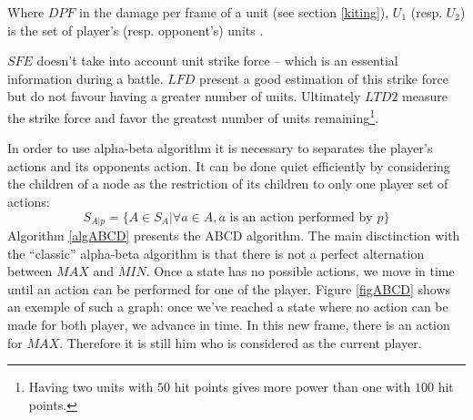 Where $DPF$ in the damage per frame of a unit (see section \ref{kiting}), $U_1$ (resp. $U_2$) is the set of player's (resp. opponent's) units .

$SFE$ doesn't take into account unit strike force -- which is an essential information during a battle. 
$LFD$ present a good estimation of this strike force but do not favour having a greater number of units. 
Ultimately $LTD2$ measure the strike force and favor the greatest number of units remaining\footnote{Having two units with $50$ hit points gives more power than one with $100$ hit points.}.

In order to use alpha-beta algorithm it is necessary to separates the player's actions and its opponents action.
It can be done quiet efficiently by considering the children of a node as the restriction of its children to only one player set of actions:
$$
S_{A|p} = \{A \in S_A | \forall a \in A, a \text{ is an action performed by $p$}\}
$$
Algorithm \ref{algABCD} presents the ABCD algorithm.
The main disctinction with the ``classic'' alpha-beta algorithm is that there is not a perfect alternation between $MAX$ and $MIN$. Once a state has no possible actions, we move in time until an action can be performed for one of the player. 
Figure \ref{figABCD} shows an exemple of such a graph: once we've reached a state where no action can be made for both player, we advance in time. In this new frame, there is an action for $MAX$. Therefore it is still him who is considered as the current player.

